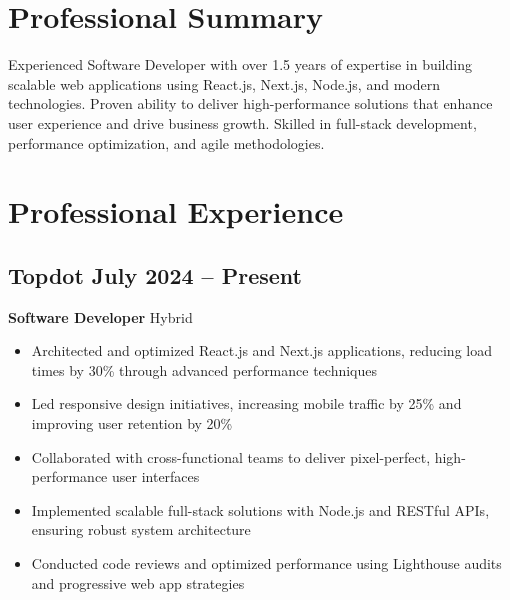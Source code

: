 

\pagestyle{empty} %
\RaggedRight %


\section{Professional Summary}
Experienced Software Developer with over 1.5 years of expertise in building scalable web applications using React.js, Next.js, Node.js, and modern technologies. Proven ability to deliver high-performance solutions that enhance user experience and drive business growth. Skilled in full-stack development, performance optimization, and agile methodologies.

\section{Professional Experience}
\subsection{Topdot \hfill July 2024 -- Present}
\textbf{Software Developer} \hfill Hybrid
\begin{itemize}
\item Architected and optimized React.js and Next.js applications, reducing load times by 30\% through advanced performance techniques
\item Led responsive design initiatives, increasing mobile traffic by 25\% and improving user retention by 20\%
\item Collaborated with cross-functional teams to deliver pixel-perfect, high-performance user interfaces
\item Implemented scalable full-stack solutions with Node.js and RESTful APIs, ensuring robust system architecture
\item Conducted code reviews and optimized performance using Lighthouse audits and progressive web app strategies
\end{itemize}

